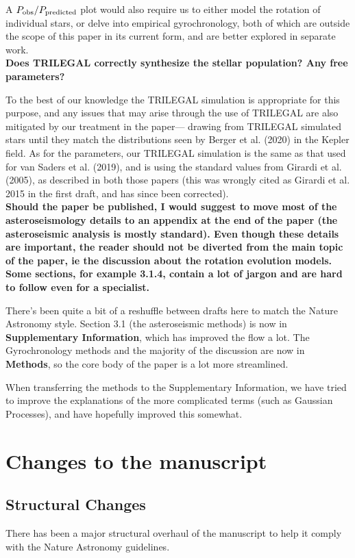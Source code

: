 \documentclass[11pt]{article}
\begin{document}
A $P_{\rm obs}/P_{\rm predicted}$  plot would also require us to either model the rotation of individual stars, or delve into empirical gyrochronology, both of which are outside the scope of this paper in its current form, and are better explored in separate work.\\

\noindent\textbf{ Does TRILEGAL correctly synthesize the stellar population? Any free parameters?}

To the best of our knowledge the TRILEGAL simulation is appropriate for this purpose, and any issues that may arise through the use of TRILEGAL are also mitigated by our treatment in the paper--- drawing from TRILEGAL simulated stars until they match the distributions seen by Berger et al. (2020) in the Kepler field. As for the parameters, our TRILEGAL simulation is the same as that used for van Saders et al. (2019), and is using the standard values from Girardi et al. (2005), as described in both those papers (this was wrongly cited as Girardi et al. 2015 in the first draft, and has since been corrected). \\

\noindent\textbf{ Should the paper be published, I would suggest to move most of the asteroseismology details to an appendix at the end of the paper (the asteroseismic analysis is mostly standard). Even though these details are important, the reader should not be diverted from the main topic of the paper, ie the discussion about the rotation evolution models.
Some sections, for example 3.1.4, contain a lot of jargon and are hard to follow even for a specialist. }

There’s been quite a bit of a reshuffle between drafts here to match the Nature Astronomy style. Section 3.1 (the asteroseismic methods) is now in \textbf{Supplementary Information}, which has improved the flow a lot. The Gyrochronology methods and the majority of the discussion are now in \textbf{Methods}, so the core body of the paper is a lot more streamlined.

When transferring the methods to the Supplementary Information, we have tried to improve the explanations of the more complicated terms (such as Gaussian Processes), and have hopefully improved this somewhat.

\clearpage
\section*{Changes to the manuscript}
\subsection*{Structural Changes}
There has been a major structural overhaul of the manuscript to help it comply with the Nature Astronomy guidelines.
\end{document}
